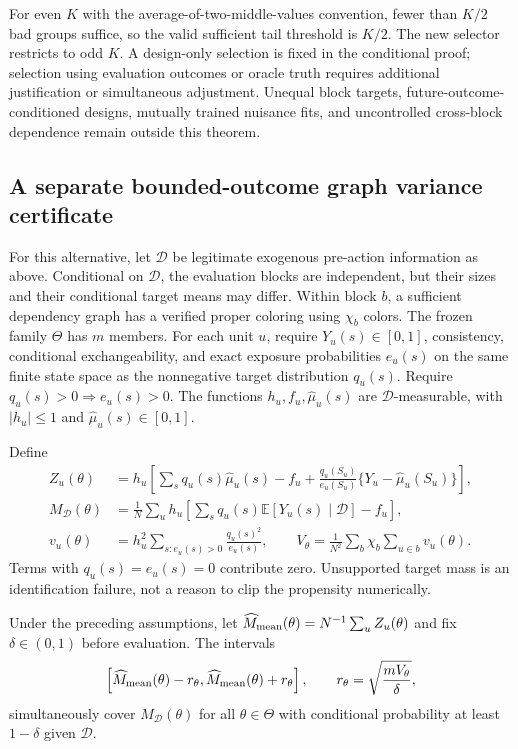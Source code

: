 For even $K$ with the average-of-two-middle-values convention, fewer than
$K/2$ bad groups suffice, so the valid sufficient tail threshold is $K/2$.
The new selector restricts to odd $K$. A design-only selection is fixed in the
conditional proof; selection using evaluation outcomes or oracle truth requires
additional justification or simultaneous adjustment. Unequal block targets,
future-outcome-conditioned designs, mutually trained nuisance fits, and
uncontrolled cross-block dependence remain outside this theorem.

\subsection{A separate bounded-outcome graph variance certificate}
\label{sec:c0-bounded-variance}

For this alternative, let $\mathcal D$ be legitimate exogenous pre-action
information as above. Conditional on $\mathcal D$, the evaluation blocks are
independent, but their sizes and their conditional target means may differ.
Within block $b$, a sufficient dependency graph has a verified proper coloring
using $\chi_b$ colors. The frozen family $\Theta$ has $m$ members.
For each unit $u$, require $Y_u(s)\in[0,1]$, consistency, conditional
exchangeability, and exact exposure probabilities $e_u(s)$ on the same finite
state space as the nonnegative target distribution $q_u(s)$.
Require $q_u(s)>0\Rightarrow e_u(s)>0$.
The functions $h_u,f_u,\widehat\mu_u(s)$ are $\mathcal D$-measurable, with
$|h_u|\le1$ and $\widehat\mu_u(s)\in[0,1]$.

Define
\begin{align*}
 Z_u(\theta)
 &=h_u\left[\sum_s q_u(s)\widehat\mu_u(s)-f_u
       +\frac{q_u(S_u)}{e_u(S_u)}
        \{Y_u-\widehat\mu_u(S_u)\}\right],\\
 M_{\mathcal D}(\theta)
 &=\frac1N\sum_u h_u
       \left[\sum_s q_u(s)\mathbb E[Y_u(s)\mid\mathcal D]-f_u\right],\\
 v_u(\theta)
 &=h_u^2\sum_{s:e_u(s)>0}\frac{q_u(s)^2}{e_u(s)},
 \qquad
 V_\theta=\frac1{N^2}\sum_b\chi_b\sum_{u\in b}v_u(\theta).
\end{align*}
Terms with $q_u(s)=e_u(s)=0$ contribute zero. Unsupported target mass is an
identification failure, not a reason to clip the propensity numerically.

\begin{theorem}
\label{thm:c0-bounded-chebyshev}
Under the preceding assumptions, let
$\widehat M_{\rm mean}(\theta)=N^{-1}\sum_u Z_u(\theta)$ and fix
$\delta\in(0,1)$ before evaluation. The intervals
\[
 \left[\widehat M_{\rm mean}(\theta)-r_\theta,
       \widehat M_{\rm mean}(\theta)+r_\theta\right],
 \qquad
 r_\theta=\sqrt{\frac{mV_\theta}{\delta}},
\]
simultaneously cover $M_{\mathcal D}(\theta)$ for all $\theta\in\Theta$
with conditional probability at least $1-\delta$ given $\mathcal D$.
\end{theorem}


